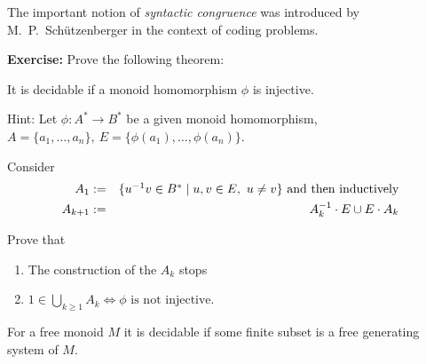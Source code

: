 The important notion of {\em syntactic congruence} was introduced by M.\
P.\ Schützen\-berger in the context of coding problems.

{\bf Exercise:} Prove the following theorem:
\begin{theorem}
It is decidable if a monoid homomorphism $\phi$ is injective.
\end{theorem}

Hint: Let $\phi: A^* \to B^*$ be a given monoid homomorphism, $A =
\{a_1,\ldots,a_n\},\ E = \{\phi(a_1),\ldots,\phi(a_n)\}$.

Consider
\begin{eqnarray*}
A_1 &:=& \mbox{$\{u^{-1} v \in B^* \mid u, v \in E,\ u\neq v \}$}\text{ and then
inductively}\\
A_{k+1} &:=& A_k^{-1} \cdot E \cup E \cdot A_k
\end{eqnarray*}

Prove that
\begin{enumerate}
  \item The construction of the $A_k$ stops
  \item $1 \in \bigcup_{k \geq 1} A_k \iff \phi\text{ is not injective}$.
\end{enumerate}


\begin{corollary}
For a free monoid $M$ it is decidable if some finite subset is a free generating
system of $M$.
\end{corollary}
